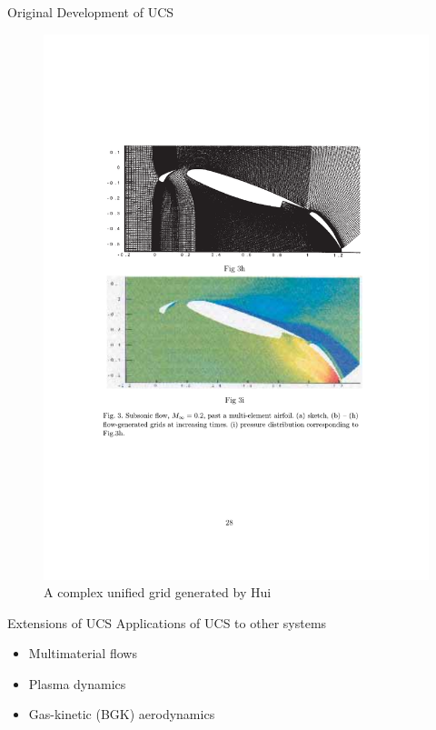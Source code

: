 \documentclass{beamer}
\begin{document}
\begin{frame}{Original Development of UCS}
  \begin{figure}
    \includegraphics[width=\textwidth]{MultiElementAirfoilGrid.pdf}
    \caption{A complex unified grid generated by Hui\cite{huimulti}}
  \end{figure}
\end{frame}

\begin{frame}{Extensions of UCS}
  Applications of UCS to other systems
  \vspace{.025in}
  \begin{itemize}
    \item Multimaterial flows\cite{jia06}
    \item Plasma dynamics\cite{zhilkin07}
    \item Gas-kinetic (BGK) aerodynamics\cite{jin07}
  \end{itemize}
\end{frame}
\end{document}

